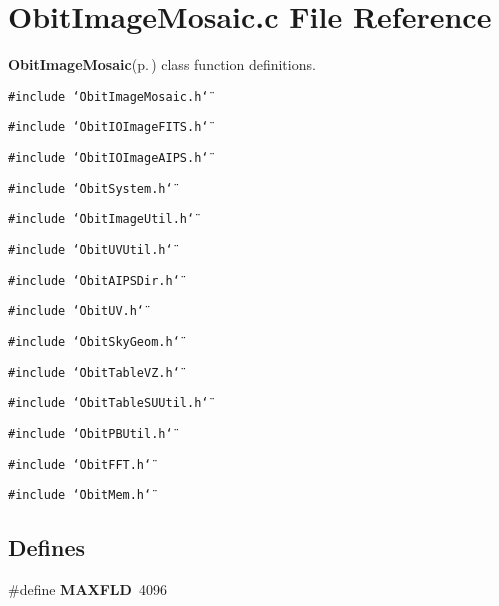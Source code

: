 \section{Obit\-Image\-Mosaic.c File Reference}
\label{ObitImageMosaic_8c}
{\bf Obit\-Image\-Mosaic}{\rm (p.\,\pageref{structObitImageMosaic})} class function definitions. 

{\tt \#include \char`\"{}Obit\-Image\-Mosaic.h\char`\"{}}\par
{\tt \#include \char`\"{}Obit\-IOImage\-FITS.h\char`\"{}}\par
{\tt \#include \char`\"{}Obit\-IOImage\-AIPS.h\char`\"{}}\par
{\tt \#include \char`\"{}Obit\-System.h\char`\"{}}\par
{\tt \#include \char`\"{}Obit\-Image\-Util.h\char`\"{}}\par
{\tt \#include \char`\"{}Obit\-UVUtil.h\char`\"{}}\par
{\tt \#include \char`\"{}Obit\-AIPSDir.h\char`\"{}}\par
{\tt \#include \char`\"{}Obit\-UV.h\char`\"{}}\par
{\tt \#include \char`\"{}Obit\-Sky\-Geom.h\char`\"{}}\par
{\tt \#include \char`\"{}Obit\-Table\-VZ.h\char`\"{}}\par
{\tt \#include \char`\"{}Obit\-Table\-SUUtil.h\char`\"{}}\par
{\tt \#include \char`\"{}Obit\-PBUtil.h\char`\"{}}\par
{\tt \#include \char`\"{}Obit\-FFT.h\char`\"{}}\par
{\tt \#include \char`\"{}Obit\-Mem.h\char`\"{}}\par
\subsection*{Defines}
\begin{CompactItemize}
\item 
\#define {\bf MAXFLD}\ 4096
\end{CompactItemize}
